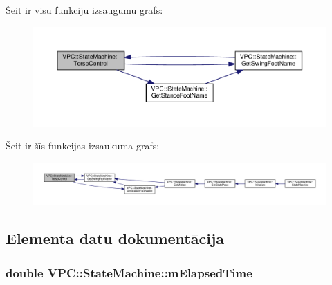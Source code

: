 Šeit ir visu funkciju izsaugumu grafs\+:
\nopagebreak
\begin{figure}[H]
\begin{center}
\leavevmode
\includegraphics[width=350pt]{class_v_p_c_1_1_state_machine_a09f8ecfe81b0e075f648b81cf545fd89_cgraph}
\end{center}
\end{figure}




Šeit ir šīs funkcijas izsaukuma grafs\+:
\nopagebreak
\begin{figure}[H]
\begin{center}
\leavevmode
\includegraphics[width=350pt]{class_v_p_c_1_1_state_machine_a09f8ecfe81b0e075f648b81cf545fd89_icgraph}
\end{center}
\end{figure}




\subsection{Elementa datu dokumentācija}
\subsubsection[{\texorpdfstring{m\+Elapsed\+Time}{mElapsedTime}}]{\setlength{\rightskip}{0pt plus 5cm}double V\+P\+C\+::\+State\+Machine\+::m\+Elapsed\+Time\hspace{0.3cm}{\ttfamily [private]}}\hypertarget{class_v_p_c_1_1_state_machine_a84f9280c1fdceceb1370f019bdf0765b}{}\label{class_v_p_c_1_1_state_machine_a84f9280c1fdceceb1370f019bdf0765b}



